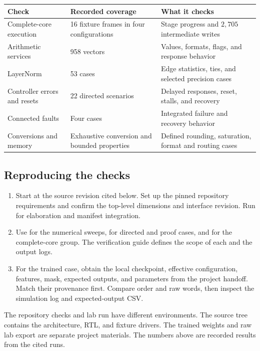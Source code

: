 {\smalltbl
\begin{tabularx}{\linewidth}{@{}P{40mm}P{33mm}Y@{}}
\toprule
Check & Recorded coverage & What it checks\\ \midrule
Complete-core execution & 16 fixture frames in four configurations & Stage progress and \(2{,}705\) intermediate writes\\
Arithmetic services & 958 vectors & Values, formats, flags, and response behavior\\
LayerNorm & 53 cases & Edge statistics, ties, and selected precision cases\\
Controller errors and resets & 22 directed scenarios & Delayed responses, reset, stalls, and recovery\\
Connected faults & Four cases & Integrated failure and recovery behavior\\
Conversions and memory & Exhaustive conversion and bounded properties & Defined rounding, saturation, format and routing cases\\
\bottomrule
\end{tabularx}}

\subsection{Reproducing the checks}
\begin{enumerate}
\setlength{\itemsep}{4pt}
\item Start at the source revision cited below. Set up the pinned repository requirements and confirm the top-level dimensions and interface revision. Run  for elaboration and manifest integration.
\item Use  for the numerical sweeps,  for directed and proof cases, and  for the complete-core group. The verification guide defines the scope of each and the output logs.
\item For the trained case, obtain the local checkpoint, effective configuration, features, mask, expected outputs, and parameters from the project handoff. Match their provenance first. Compare order and raw words, then inspect the simulation log and expected-output CSV.
\end{enumerate}

The repository checks and lab run have different environments. The source tree contains the architecture, RTL, and fixture drivers. The trained weights and raw lab export are separate project materials. The numbers above are recorded results from the cited runs.
\clearpage

